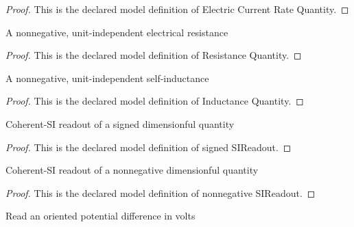 \begin{proof}
  This is the declared model definition of Electric Current Rate Quantity.
\end{proof}
\begin{definition}
  \label{def:physics:phyx-mini-0988:phyxminiproblems-problemphyxmini0988-resistancequantity}
  A nonnegative, unit-independent electrical resistance
\end{definition}
\begin{proof}
  This is the declared model definition of Resistance Quantity.
\end{proof}
\begin{definition}
  \label{def:physics:phyx-mini-0988:phyxminiproblems-problemphyxmini0988-inductancequantity}
  A nonnegative, unit-independent self-inductance
\end{definition}
\begin{proof}
  This is the declared model definition of Inductance Quantity.
\end{proof}
\begin{definition}
  \label{def:physics:phyx-mini-0988:phyxminiproblems-problemphyxmini0988-signedsireadout}
  Coherent-SI readout of a signed dimensionful quantity
\end{definition}
\begin{proof}
  This is the declared model definition of signed SIReadout.
\end{proof}
\begin{definition}
  \label{def:physics:phyx-mini-0988:phyxminiproblems-problemphyxmini0988-nonnegativesireadout}
  Coherent-SI readout of a nonnegative dimensionful quantity
\end{definition}
\begin{proof}
  This is the declared model definition of nonnegative SIReadout.
\end{proof}
\begin{definition}
  \label{def:physics:phyx-mini-0988:phyxminiproblems-problemphyxmini0988-potentialdifferenceinvolts}
  Read an oriented potential difference in volts
\end{definition}
